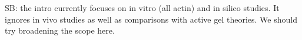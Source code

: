 \documentclass[11pt]{article}
\begin{document}
{\color{blue}SB: the intro currently focuses on in vitro (all actin) and in silico studies. It ignores in vivo studies as well as comparisons with active gel theories. We should try broadening the scope here.}
\end{document}
